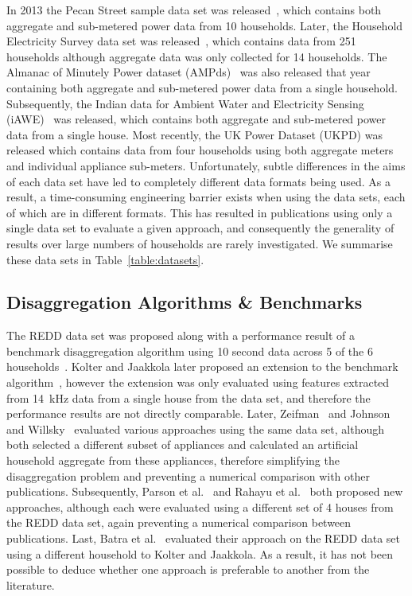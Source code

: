 \documentclass{sig-alternate}
\newcommand{\bluecolor}[1]{\textcolor{blue}{#1}}
\newcommand{\tabref}[1]{Table~\ref{#1}}
\begin{document}
In 2013 the Pecan Street sample data set was released~\cite{pecan}, which contains both aggregate and sub-metered power data from 10 households. Later, the Household Electricity Survey data set was released~\cite{hes}, which contains data from 251 households although aggregate data was only collected for 14 households. The Almanac of Minutely Power dataset (AMPds)~\cite{ampds} was also released that year containing both aggregate and sub-metered power data from a single household. Subsequently, the Indian data for Ambient Water and Electricity Sensing (iAWE)~\cite{iawe} was released, which contains both aggregate and sub-metered power data from a single house. Most recently, the UK Power Dataset (UKPD) \cite{ukpd} was released which contains data from four households using both aggregate meters and individual appliance sub-meters. Unfortunately, subtle differences in the aims of each data set have led to completely different data formats being used. As a result, a time-consuming engineering barrier exists when using the data sets, each of which are in different formats. This has resulted in publications using only a single data set to evaluate a given approach, and consequently the generality of results over large numbers of households are rarely investigated. We summarise these data sets in \tabref{table:datasets}.

\subsection{Disaggregation Algorithms \& Benchmarks}
\label{sec:algorithms}
\noindent The REDD data set was proposed along with a performance result of a benchmark disaggregation algorithm using 10 second data across 5 of the 6 households~\cite{redd}. Kolter and Jaakkola later proposed an extension to the benchmark algorithm~\cite{kolter_2012}, however the extension was only evaluated using features extracted from 14~kHz data from a single house from the data set, and therefore the performance results are not directly comparable. Later, Zeifman~\cite{zeifman_2012} and Johnson and Willsky~\cite{johnson_2013} evaluated various approaches using the same data set, although both selected a different subset of appliances and calculated an artificial household aggregate from these appliances, therefore simplifying the disaggregation problem and preventing a numerical comparison with other publications. Subsequently, Parson et al.~\cite{parson_2012} and Rahayu et al.~\cite{rahayu_2012} both proposed new approaches, although each were evaluated using a different set of 4 houses from the REDD data set, again preventing a numerical comparison between publications. Last, Batra et al.~\cite{batra_2013} evaluated their approach on the REDD data set using a different household to Kolter and Jaakkola. As a result, it has not been possible to deduce whether one approach is preferable to another from the literature.
\end{document}
